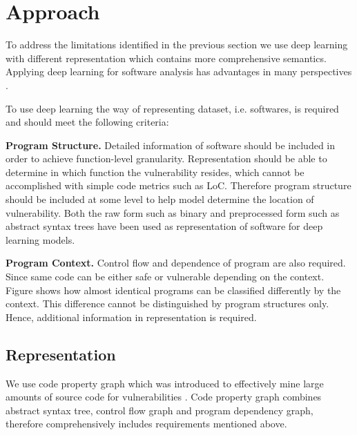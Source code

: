 \section{Approach}

To address the limitations identified in the previous section we use deep learning with different representation which contains more comprehensive semantics.
Applying deep learning for software analysis has advantages in many perspectives \cite{shin2015recognizing}.

To use deep learning the way of representing dataset, i.e. softwares, is required and should meet the following criteria:


\textbf{Program Structure.} Detailed information of software should be included in order to achieve function-level granularity.
Representation should be able to determine in which function the vulnerability resides, which cannot be accomplished with simple code metrics such as LoC.
Therefore program structure should be included at some level to help model determine the location of vulnerability.
Both the raw form such as binary \cite{shin2015recognizing, kosmidis2017machine} and preprocessed form such as abstract syntax trees \cite{wang2016automatically}
have been used as representation of software for deep learning models.


\textbf{Program Context.} Control flow and dependence of program are also required. Since same code can be either safe or vulnerable depending on the context.
Figure shows how almost identical programs can be classified differently by the context.
This difference cannot be distinguished by program structures only. Hence, additional information in representation is required.


\subsection{Representation}
We use code property graph which was introduced to effectively mine large amounts of source code for vulnerabilities \cite{yamaguchi2014modeling}.
Code property graph combines abstract syntax tree, control flow graph and program dependency graph, therefore comprehensively includes requirements mentioned above.

